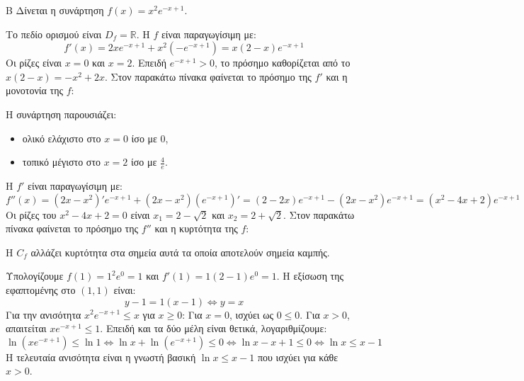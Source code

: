 \begin{thema}{Β}
Δίνεται η συνάρτηση $f(x) = x^2e^{-x+1}$.

\begin{erwthma}
\item Το πεδίο ορισμού είναι $D_f = \mathbb{R}$. Η $f$ είναι παραγωγίσιμη με:
\[ f'(x) = 2x e^{-x+1} + x^2(-e^{-x+1}) = x(2- x)e^{-x+1} \]
Οι ρίζες είναι $x=0$ και $x=2$. Επειδή $e^{-x+1} > 0$, το πρόσημο καθορίζεται από το $x(2-x) = -x^2+2x$.
Στον παρακάτω πίνακα φαίνεται το πρόσημο της $f'$ και η μονοτονία της $f$:
\begin{center}
\end{center}
Η συνάρτηση παρουσιάζει:
\begin{itemize}
\item ολικό ελάχιστο στο $x=0$ ίσο με $0$,
\item τοπικό μέγιστο στο $x=2$ ίσο με $\frac{4}{e}$.
\end{itemize}

\item Η $f'$ είναι παραγωγίσιμη με:
\[ f''(x) = (2x-x^2)'e^{-x+1} + (2x-x^2)(e^{-x+1})' = (2-2x)e^{-x+1} - (2x-x^2)e^{-x+1} = (x^2-4x+2)e^{-x+1} \]
Οι ρίζες του $x^2-4x+2=0$ είναι $x_1 = 2-\sqrt{2}$ και $x_2 = 2+\sqrt{2}$.
Στον παρακάτω πίνακα φαίνεται το πρόσημο της $f''$ και η κυρτότητα της $f$:
\begin{center}
\end{center}
Η $C_f$ αλλάζει κυρτότητα στα σημεία αυτά τα οποία αποτελούν σημεία καμπής.

\item Υπολογίζουμε $f(1) = 1^2e^0 = 1$ και $f'(1) = 1(2-1)e^0 = 1$.
Η εξίσωση της εφαπτομένης στο $(1, 1)$ είναι:
\[ y - 1 = 1(x - 1) \Leftrightarrow y = x \]
Για την ανισότητα $x^2e^{-x+1} \le x$ για $x \ge 0$:
Για $x=0$, ισχύει ως $0 \le 0$.
Για $x > 0$, απαιτείται $x e^{-x+1} \le 1$. Επειδή και τα δύο μέλη είναι θετικά, λογαριθμίζουμε:
\[ \ln(xe^{-x+1}) \le \ln 1 \Leftrightarrow \ln x + \ln(e^{-x+1}) \le 0 \Leftrightarrow \ln x - x + 1 \le 0 \Leftrightarrow \ln x \le x - 1 \]
Η τελευταία ανισότητα είναι η γνωστή βασική $\ln x \le x-1$ που ισχύει για κάθε $x>0$.


\end{erwthma}
\end{thema}
